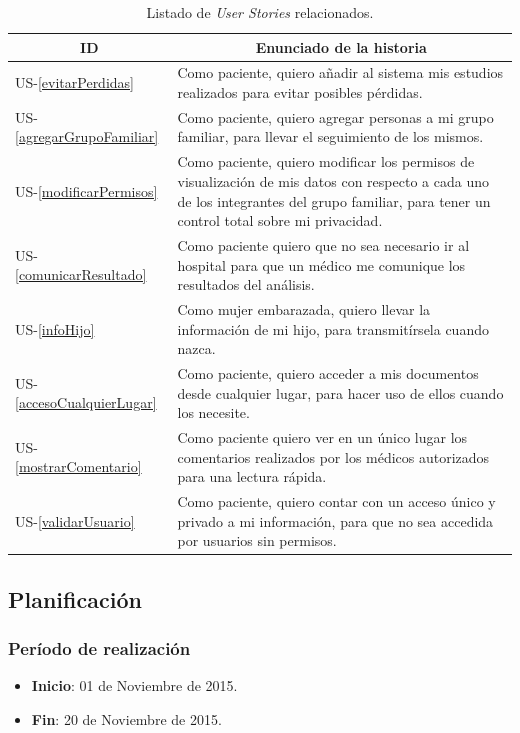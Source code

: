 \begin{table}[h]
    \centering
	\begin{tabular}{|l|p{9cm}|}
	\hline
        \multicolumn{1}{|c|}{\textbf{ID}} &
        \multicolumn{1}{|c|}{\textbf{Enunciado de la historia}} \\          
    \hline
        US-\ref{evitarPerdidas} &
        Como paciente, quiero  añadir al sistema mis estudios realizados para evitar posibles pérdidas.\\
    \hline
       	US-\ref{agregarGrupoFamiliar} &
       	Como paciente, quiero agregar personas a mi grupo familiar, para llevar el seguimiento de los mismos. \\
    \hline
       	US-\ref{modificarPermisos} &
       	Como paciente, quiero modificar los permisos de visualización de mis datos con respecto a cada uno de los integrantes del grupo familiar, para tener un control total sobre mi privacidad. \\
    \hline 
        US-\ref{comunicarResultado} &
        Como paciente quiero que no sea necesario ir al hospital para que un médico me comunique los resultados del análisis.\\
    \hline
       	US-\ref{infoHijo} &
       	Como mujer embarazada, quiero llevar la información de mi hijo, para transmitírsela cuando nazca. \\
    \hline
    	US-\ref{accesoCualquierLugar} &
    	Como paciente, quiero acceder a mis documentos desde cualquier lugar, para hacer uso de ellos cuando los necesite. \\
    \hline
        US-\ref{mostrarComentario} &
        Como paciente quiero ver en un único lugar los comentarios realizados por los médicos autorizados para una lectura rápida.\\
    \hline     
        US-\ref{validarUsuario} &
        Como paciente, quiero contar con un acceso único y privado a mi información, para que no sea accedida por usuarios sin permisos.\\
    \hline
    \end{tabular}
    \caption{Listado de \textit{User Stories} relacionados.}
    \label{US-Sprint9}
\end{table}
\subsection{Planificación}
\subsubsection{Período de realización}
\begin{itemize}
	\item \textbf{Inicio}: 01 de Noviembre de 2015.
	\item \textbf{Fin}: 20 de Noviembre de 2015.
\end{itemize}


